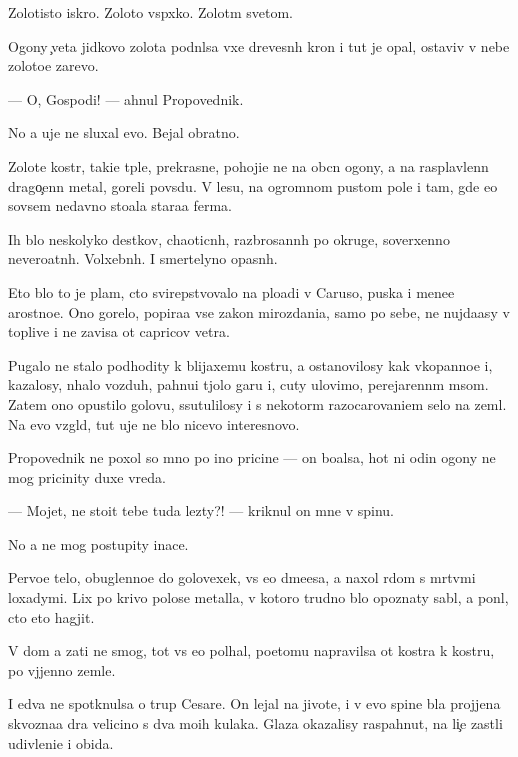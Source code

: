 \documentclass[10pt]{book}
\begin{document}
Zolotisto{\y} iskro{\y}. Zoloto{\y} vsp{\yi}xko{\y}. Zolot{\yi}m svetom.

Ogony {\c}veta jidkovo zolota podn{\ia}lsa v{\yi}xe drevesn{\yi}h kron i tut je opal, ostaviv v nebe zoloto{\y}e zarevo.

— O, Gospodi! — ahnul Propovednik.

No {\y}a uje ne sluxal {\y}evo. Bejal obratno.



Zolot{\yi}{\y}e kostr{\yi}, taki{\y}e t{\e}pl{\yi}{\y}e, prekrasn{\yi}{\y}e, pohoji{\y}e ne na ob{\yi}cn{\yi}{\y} ogony, a na rasplavlenn{\yi}{\y} drago{\c}enn{\yi}{\y} metal, goreli povs{\io}du. V lesu, na ogromnom pustom pole i tam, gde {\y}e{\x}o sovsem nedavno sto{\y}ala stara{\y}a ferma.

Ih b{\yi}lo neskolyko des{\ia}tkov, chaoticn{\yi}h, razbrosann{\yi}h po okruge, soverxenno nevero{\y}atn{\yi}h. Volxebn{\yi}h. I smertelyno opasn{\yi}h.

Eto b{\yi}lo to je plam{\ia}, cto svirepstvovalo na plo{\x}adi v Caruso, puska{\y} i mene{\y}e {\y}arostno{\y}e. Ono gorelo, popira{\y}a vse zakon{\yi} mirozdani{\y}a, samo po sebe, ne nujda{\y}asy v toplive i ne zavisa ot capricov vetra.

Pugalo ne stalo podhodity k blija{\y}xemu kostru, a ostanovilosy kak vkopanno{\y}e i, kazalosy, n{\io}halo vozduh, pahnu{\x}i{\y} t{\ia}jolo{\y} gar{\y}u i, cuty ulovimo, perejarenn{\yi}m m{\ia}som. Zatem ono opustilo golovu, ssutulilosy i s nekotor{\yi}m razocarovani{\y}em selo na zeml{\io}. Na {\y}evo vzgl{\ia}d, tut uje ne b{\yi}lo nicevo interesnovo.

Propovednik ne poxol so mno{\y} po ino{\y} pricine — on bo{\y}alsa, hot{\ia} ni odin ogony ne mog pricinity duxe vreda.

— Mojet, ne stoit tebe tuda lezty?! — kriknul on mne v spinu.

No {\y}a ne mog postupity inace.

Pervo{\y}e telo, obuglenno{\y}e do golovexek, vs{\e} {\y}e{\x}o d{\yi}m{\ia}{\x}e{\y}esa, {\y}a naxol r{\ia}dom s m{\e}rtv{\yi}mi loxadymi. Lix po krivo{\y} polose metalla, v kotoro{\y} trudno b{\yi}lo opoznaty sabl{\io}, {\y}a pon{\ia}l, cto eto hagjit.

V dom {\y}a za{\y}ti ne smog, tot vs{\e} {\y}e{\x}o pol{\yi}hal, poetomu napravilsa ot kostra k kostru, po v{\yi}jjenno{\y} zemle.

I {\y}edva ne spotknulsa o trup Cesare. On lejal na jivote, i v {\y}evo spine b{\yi}la projjena skvozna{\y}a d{\yi}ra velicino{\y} s dva mo{\y}ih kulaka. Glaza okazalisy raspahnut{\yi}, na li{\c}e zast{\yi}li udivleni{\y}e i obida.
\end{document}
